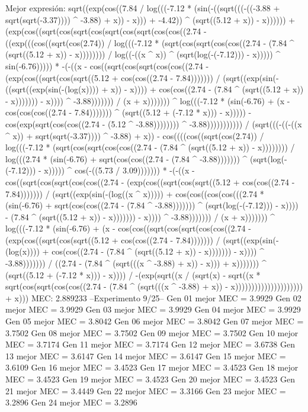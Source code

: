 Mejor expresión: sqrt((exp(cos((7.84 / log(((-7.12 * (sin(-((sqrt(((-((-3.88 + sqrt(sqrt(-3.37)))) ^ -3.88) + x)) - x))) + -4.42)) ^ (sqrt((5.12 + x)) - x)))))) + (exp(cos((sqrt(cos(sqrt(cos(sqrt(cos(sqrt(cos(cos((2.74 - ((exp(((cos((sqrt(cos(2.74)) / log(((-7.12 * (sqrt(cos(sqrt(cos(cos((2.74 - (7.84 ^ (sqrt((5.12 + x)) - x)))))))) / log((-((x ^ x)) ^ (sqrt(log(-(-7.12))) - x))))) ^ sin(-6.76))))) * -(-((x - cos((sqrt(cos(sqrt(cos(cos((2.74 - (exp(cos((sqrt(cos(sqrt((5.12 + cos(cos((2.74 - 7.84))))))) / (sqrt((exp(sin(-((sqrt((exp(sin(-(log(x)))) + x)) - x)))) + cos(cos((2.74 - (7.84 ^ (sqrt((5.12 + x)) - x))))))) - x)))) ^ -3.88))))))) / (x + x))))))) ^ log(((-7.12 * (sin(-6.76) + (x - cos(cos(cos((2.74 - 7.84))))))) ^ (sqrt((5.12 + (-7.12 * x))) - x))))) - cos(exp(sqrt(cos(cos((2.74 - (5.12 ^ -3.88)))))))) ^ -3.88))))))))))) / (sqrt(((-((-((x ^ x)) + sqrt(sqrt(-3.37)))) ^ -3.88) + x)) - cos((((cos((sqrt(cos(2.74)) / log(((-7.12 * (sqrt(cos(sqrt(cos(cos((2.74 - (7.84 ^ (sqrt((5.12 + x)) - x)))))))) / log(((2.74 * (sin(-6.76) + sqrt(cos(cos((2.74 - (7.84 ^ -3.88))))))) ^ (sqrt(log(-(-7.12))) - x))))) ^ cos(-((5.73 / 3.09))))))) * -(-((x - cos((sqrt(cos(sqrt(cos(cos((2.74 - (exp(cos((sqrt(cos(sqrt((5.12 + cos(cos((2.74 - 7.84))))))) / (sqrt((exp(sin(-(log((x ^ x))))) + cos(cos((cos(cos(((2.74 * (sin(-6.76) + sqrt(cos(cos((2.74 - (7.84 ^ -3.88))))))) ^ (sqrt(log(-(-7.12))) - x)))) - (7.84 ^ (sqrt((5.12 + x)) - x))))))) - x)))) ^ -3.88))))))) / (x + x))))))) ^ log(((-7.12 * (sin(-6.76) + (x - cos(cos((sqrt(cos(sqrt(cos(cos((2.74 - (exp(cos((sqrt(cos(sqrt((5.12 + cos(cos((2.74 - 7.84))))))) / (sqrt((exp(sin(-(log(x)))) + cos(cos((2.74 - (7.84 ^ (sqrt((5.12 + x)) - x))))))) - x)))) ^ -3.88))))))) / ((2.74 - (7.84 ^ (sqrt(((x ^ -3.88) + x)) - x))) + x))))))) ^ (sqrt((5.12 + (-7.12 * x))) - x)))) / -(exp(sqrt((x / (sqrt(x) - sqrt((x * sqrt(cos(sqrt(cos(cos((2.74 - (7.84 ^ (sqrt(((x ^ -3.88) + x)) - x))))))))))))))))))))) + x)))
MEC: 2.889233
--Experimento 
 9/25--
Gen 01 mejor MEC = 3.9929
Gen 02 mejor MEC = 3.9929
Gen 03 mejor MEC = 3.9929
Gen 04 mejor MEC = 3.9929
Gen 05 mejor MEC = 3.8042
Gen 06 mejor MEC = 3.8042
Gen 07 mejor MEC = 3.7502
Gen 08 mejor MEC = 3.7502
Gen 09 mejor MEC = 3.7502
Gen 10 mejor MEC = 3.7174
Gen 11 mejor MEC = 3.7174
Gen 12 mejor MEC = 3.6738
Gen 13 mejor MEC = 3.6147
Gen 14 mejor MEC = 3.6147
Gen 15 mejor MEC = 3.6109
Gen 16 mejor MEC = 3.4523
Gen 17 mejor MEC = 3.4523
Gen 18 mejor MEC = 3.4523
Gen 19 mejor MEC = 3.4523
Gen 20 mejor MEC = 3.4523
Gen 21 mejor MEC = 3.4449
Gen 22 mejor MEC = 3.3166
Gen 23 mejor MEC = 3.2896
Gen 24 mejor MEC = 3.2896
